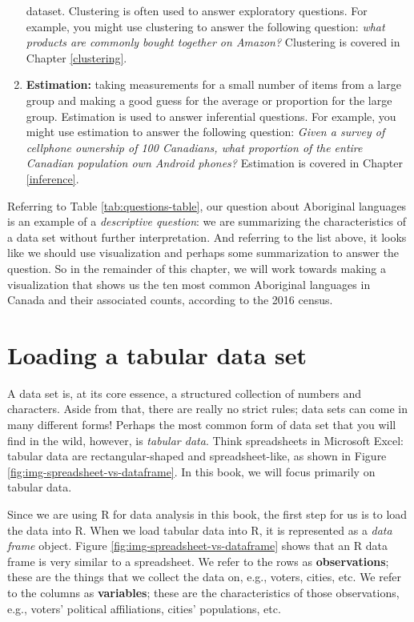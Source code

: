 \documentclass[
  12pt,
]{krantz}
\begin{document}
\begin{enumerate}
  dataset. Clustering is often used to answer exploratory questions.
  For example, you might use clustering to answer the following question:
  \emph{what products are commonly bought together on Amazon?}
  Clustering is covered in Chapter \ref{clustering}.
\item
  \textbf{Estimation:}  taking measurements for a small number of items from a large group
  and making a good guess for the average or proportion for the large group. Estimation
  is used to answer inferential questions.
  For example, you might use estimation to answer the following question:
  \emph{Given a survey of cellphone ownership of 100 Canadians, what proportion
  of the entire Canadian population own Android phones?}
  Estimation is covered in Chapter \ref{inference}.
\end{enumerate}

Referring to Table \ref{tab:questions-table}, our question about
Aboriginal languages is an example of a \emph{descriptive question}: we are
summarizing the characteristics of a data set without further interpretation.
And referring to the list above, it looks like we should use visualization
and perhaps some summarization to answer the question. So in the remainder
of this chapter, we will work towards making a visualization that shows
us the ten most common Aboriginal languages in Canada and their associated counts,
according to the 2016 census.

\hypertarget{loading-a-tabular-data-set}{%
\section{Loading a tabular data set}\label{loading-a-tabular-data-set}}

A data set is, at its core essence, a structured collection of numbers and characters.
Aside from that, there are really no strict rules; data sets can come in
many different forms! Perhaps the most common form of data set that you will
find in the wild, however, is \emph{tabular data}. Think spreadsheets in Microsoft Excel: tabular data are
rectangular-shaped and spreadsheet-like, as shown in Figure
\ref{fig:img-spreadsheet-vs-dataframe}. In this book, we will focus primarily on tabular data.

Since we are using R for data analysis in this book, the first step for us is to
load the data into R. When we load tabular data into
R, it is represented as a \emph{data frame} object. Figure
\ref{fig:img-spreadsheet-vs-dataframe} shows that an R data frame is very similar
to a spreadsheet. We refer to the rows as  \textbf{observations}; these are the things that we
collect the data on, e.g., voters, cities, etc. We refer to the columns as 
\textbf{variables}; these are the characteristics of those observations, e.g., voters' political
affiliations, cities' populations, etc.
\end{document}
